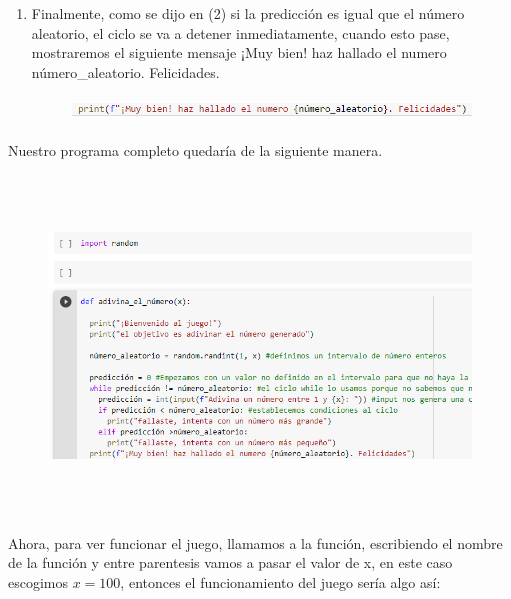 \documentclass[a4paper,12pt]{article}
\begin{document}
\begin{enumerate}
    \item \large{Finalmente, como se dijo en (2) si la predicción es igual que el número aleatorio, el ciclo se va a detener inmediatamente, cuando esto pase, mostraremos el siguiente mensaje {¡Muy bien! haz hallado el numero {número_aleatorio}. Felicidades}.}

    \begin{figure}[H]
    \caption{}
    \centering \includegraphics[width=13cm, height=0.7cm]{print3.png}
    \label{fig1:my_label}
    \end{figure}  
    
\end{enumerate}  

\large{Nuestro programa completo quedaría de la siguiente manera.}

    \begin{figure}[H]
    \caption{}
    \centering \includegraphics[width=14cm, height=9cm]{pro.png}
    \label{fig1:my_label}
    \end{figure}  

\large{Ahora, para ver funcionar el juego, llamamos a la función, escribiendo el nombre de la función y entre parentesis vamos a pasar el valor de x, en este caso escogimos $x=100$, entonces el funcionamiento del juego sería algo así:}
\end{document}
